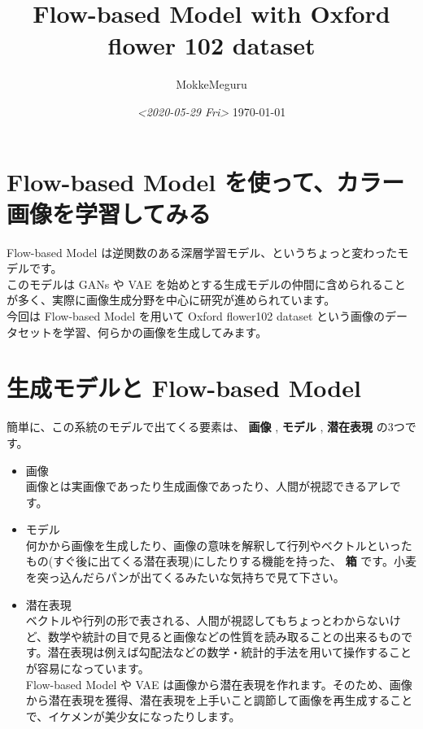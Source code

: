 \documentclass[dvipdfmx]{article}
\author{MokkeMeguru}
\date{\textit{<2020-05-29 Fri>} \today}
\title{Flow-based Model with Oxford flower 102 dataset}
\begin{document}
\maketitle
\tableofcontents


\section{Flow-based Model を使って、カラー画像を学習してみる}
\label{sec:orgabd025f}
Flow-based Model は逆関数のある深層学習モデル、というちょっと変わったモデルです。\\
このモデルは GANs や VAE を始めとする生成モデルの仲間に含められることが多く、実際に画像生成分野を中心に研究が進められています。\\

今回は Flow-based Model を用いて Oxford flower102 dataset という画像のデータセットを学習、何らかの画像を生成してみます。\\
\section{生成モデルと Flow-based Model}
\label{sec:org2d99bd0}
簡単に、この系統のモデルで出てくる要素は、 \textbf{画像} , \textbf{モデル} , \textbf{潜在表現} の3つです。\\

\begin{itemize}
\item 画像\\
画像とは実画像であったり生成画像であったり、人間が視認できるアレです。\\
\item モデル\\
何かから画像を生成したり、画像の意味を解釈して行列やベクトルといったもの(すぐ後に出てくる潜在表現)にしたりする機能を持った、 \textbf{箱} です。小麦を突っ込んだらパンが出てくるみたいな気持ちで見て下さい。\\
\item 潜在表現\\
ベクトルや行列の形で表される、人間が視認してもちょっとわからないけど、数学や統計の目で見ると画像などの性質を読み取ることの出来るものです。潜在表現は例えば勾配法などの数学・統計的手法を用いて操作することが容易になっています。\\
Flow-based Model や VAE は画像から潜在表現を作れます。そのため、画像から潜在表現を獲得、潜在表現を上手いこと調節して画像を再生成することで、イケメンが美少女になったりします。\\
\end{itemize}
\end{document}

